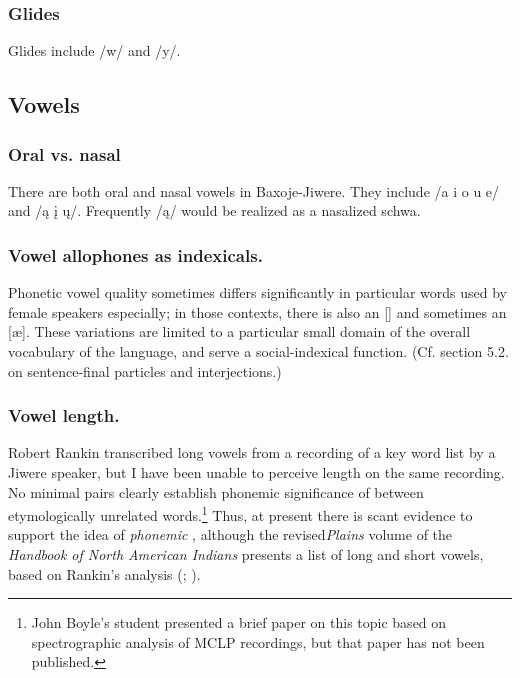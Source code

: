 \documentclass[output=paper]{LSP/langsci}
\begin{document}
\subsubsection{Glides} Glides include /w/ and /y/.  

\subsection{Vowels} 										      	         	          
\subsubsection{Oral vs. nasal}  There are both oral and nasal vowels in Baxoje-Jiwere.   They include /a i o u e/ and /\k{a} \k{i} \k{u}/. Frequently /\k{a}/ would be realized as a nasalized schwa. 

\subsubsection{Vowel allophones as  indexicals.}  Phonetic vowel quality sometimes differs significantly in particular words used by female speakers especially; in those contexts, there is also an [] and sometimes an [\ae].  These variations are limited to a particular small domain of the overall vocabulary of the language, and serve a social-indexical function. (Cf. section 5.2. on sentence-final particles and interjections.)   

\subsubsection{Vowel length.}  Robert Rankin transcribed long vowels from a recording of a key word list by a Jiwere speaker, but I have been unable to perceive length on the same recording. No minimal pairs clearly establish phonemic significance of  between etymologically unrelated words.\footnote{John Boyle's student presented a brief paper on this topic based on spectrographic analysis of MCLP recordings, but that paper has not been published.}  Thus, at present there is scant evidence to support the idea of \textit{phonemic} , although the revised\emph{Plains} volume of the \textit{Handbook of North American Indians} presents a list of long and short vowels, based on Rankin's analysis (\citealt[432]{Wedel2001}; \citealt[447]{Schweitzer2001}).  	         
\end{document}
